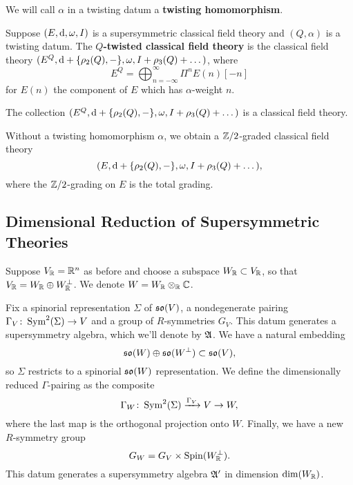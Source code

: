 \documentclass[10pt, oneside]{article}
\begin{document}
We will call $\alpha$ in a twisting datum a {\bf twisting homomorphism}.

\begin{definition} \label{def:twisting}
Suppose $(E, {\rm d}, \omega, I)$ is a supersymmetric classical field theory and $(Q, \alpha)$ is a twisting datum. The {\bf $Q$-twisted classical field theory} is the classical field theory $(E^Q, {\rm d} + \{\rho_2(Q), -\}, \omega, I + \rho_3(Q) + \dots)$, where
\[E^Q = \bigoplus_{n=-\infty}^\infty \Pi^n E(n)[-n]\]
for $E(n)$ the component of $E$ which has $\alpha$-weight $n$.
\end{definition}

\begin{prop}
The collection $(E^Q, {\rm d} + \{\rho_2(Q), -\}, \omega, I + \rho_3(Q) + \dots)$ is a classical field theory.
\end{prop}

\begin{remark}
Without a twisting homomorphism $\alpha$, we obtain a $\mathbb Z/2$-graded classical field theory
\[(E, {\rm d} + \{\rho_2(Q), -\}, \omega, I + \rho_3(Q) + \dots),\]
where the $\mathbb Z/2$-grading on $E$ is the total grading.
\end{remark}

\subsection{Dimensional Reduction of Supersymmetric Theories}

Suppose $V_\mathbb R=\mathbb R^n$ as before and choose a subspace $W_\mathbb R\subset V_\mathbb R$, so that $V_\mathbb R = W_\mathbb R\oplus W^\perp_\mathbb R$. We denote $W=W_{\mathbb R}\otimes_{\mathbb R} \mathbb C$.

Fix a spinorial representation $\Sigma$ of $\mathfrak{so}(V)$, a nondegenerate pairing $\Gamma_V\colon \operatorname{Sym}^2(\Sigma)\rightarrow V$ and a group of $R$-symmetries $G_V$.  This datum generates a supersymmetry algebra, which we'll denote by $\mathfrak{A}$.  We have a natural embedding
\[\mathfrak{so}(W)\oplus \mathfrak{so}(W^{\perp})\subset \mathfrak{so}(V),\]
so $\Sigma$ restricts to a spinorial $\mathfrak{so}(W)$ representation. We define the dimensionally reduced $\Gamma$-pairing as the composite
\[\Gamma_W\colon \operatorname{Sym}^2(\Sigma)\xrightarrow{\Gamma_V} V\rightarrow W,\]
where the last map is the orthogonal projection onto $W$. Finally, we have a new $R$-symmetry group
\[G_W = G_V\times \mathrm{Spin}(W^\perp_\mathbb R).\]
This datum generates a supersymmetry algebra $\mathfrak{A}'$ in dimension $\mathrm{dim}(W_\mathbb R)$.
\end{document}
